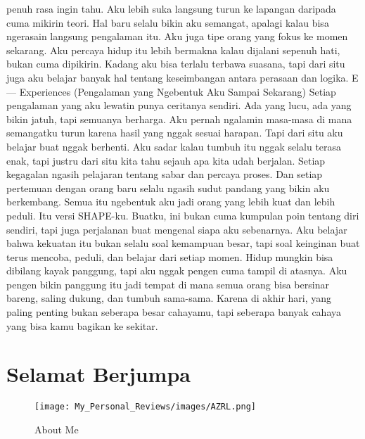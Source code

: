 \documentclass[
  letterpaper,
  DIV=11,
  numbers=noendperiod]{scrreprt}
\begin{document}
penuh rasa ingin tahu. Aku lebih suka langsung turun ke lapangan
daripada cuma mikirin teori. Hal baru selalu bikin aku semangat, apalagi
kalau bisa ngerasain langsung pengalaman itu. Aku juga tipe orang yang
fokus ke momen sekarang. Aku percaya hidup itu lebih bermakna kalau
dijalani sepenuh hati, bukan cuma dipikirin. Kadang aku bisa terlalu
terbawa suasana, tapi dari situ juga aku belajar banyak hal tentang
keseimbangan antara perasaan dan logika. E --- Experiences (Pengalaman
yang Ngebentuk Aku Sampai Sekarang) Setiap pengalaman yang aku lewatin
punya ceritanya sendiri. Ada yang lucu, ada yang bikin jatuh, tapi
semuanya berharga. Aku pernah ngalamin masa-masa di mana semangatku
turun karena hasil yang nggak sesuai harapan. Tapi dari situ aku belajar
buat nggak berhenti. Aku sadar kalau tumbuh itu nggak selalu terasa
enak, tapi justru dari situ kita tahu sejauh apa kita udah berjalan.
Setiap kegagalan ngasih pelajaran tentang sabar dan percaya proses. Dan
setiap pertemuan dengan orang baru selalu ngasih sudut pandang yang
bikin aku berkembang. Semua itu ngebentuk aku jadi orang yang lebih kuat
dan lebih peduli. Itu versi SHAPE-ku. Buatku, ini bukan cuma kumpulan
poin tentang diri sendiri, tapi juga perjalanan buat mengenal siapa aku
sebenarnya. Aku belajar bahwa kekuatan itu bukan selalu soal kemampuan
besar, tapi soal keinginan buat terus mencoba, peduli, dan belajar dari
setiap momen. Hidup mungkin bisa dibilang kayak panggung, tapi aku nggak
pengen cuma tampil di atasnya. Aku pengen bikin panggung itu jadi tempat
di mana semua orang bisa bersinar bareng, saling dukung, dan tumbuh
sama-sama. Karena di akhir hari, yang paling penting bukan seberapa
besar cahayamu, tapi seberapa banyak cahaya yang bisa kamu bagikan ke
sekitar.


\chapter*{Selamat Berjumpa}\label{selamat-berjumpa}


\begin{figure}[H]

{\centering \texttt{[image: My\_Personal\_Reviews/images/AZRL.png]}

}

\caption{About Me}

\end{figure}%
\end{document}
